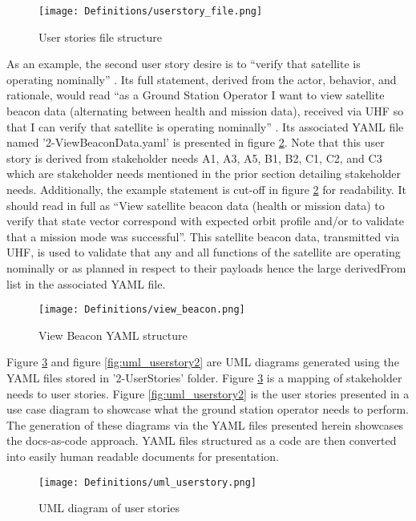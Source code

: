 \documentclass[journal,article,submit,pdftex,moreauthors]{Definitions/mdpi}
\begin{document}
\begin{figure}[H]
    \texttt{[image: Definitions/userstory\_file.png]}
    \caption{User stories file structure}
	\label{fig:userstory_file}
    \end{figure}
	\noindent   
\unskip

As an example, the second user story desire is to “verify that satellite is operating nominally” \cite{sealion_mission_architecture}.  Its full statement, derived from the actor, behavior, and rationale, would read “as a Ground Station Operator I want to view satellite beacon data (alternating between health and mission data), received via UHF so that I can verify that satellite is operating nominally” \cite{sealion_page}.  Its associated YAML file named '2-ViewBeaconData.yaml' is presented in figure \ref{fig:view_beacon}.  Note that this user story is derived from stakeholder needs A1, A3, A5, B1, B2, C1, C2, and C3 which are stakeholder needs mentioned in the prior section detailing stakeholder needs.  Additionally, the example statement is cut-off in figure \ref{fig:view_beacon} for readability.  It should read in full as “View satellite beacon data (health or mission data) to verify that state vector correspond with expected orbit profile and/or to validate that a mission mode was successful”.  This satellite beacon data, transmitted via UHF, is used to validate that any and all functions of the satellite are operating nominally or as planned in respect to their payloads hence the large derivedFrom list in the associated YAML file.

\begin{figure}[H]
    \texttt{[image: Definitions/view\_beacon.png]}
    \caption{View Beacon YAML structure}
	\label{fig:view_beacon}
    \end{figure}
	\noindent   
\unskip

Figure \ref{fig:uml_userstory} and figure \ref{fig:uml_userstory2} are UML diagrams generated using the YAML files stored in '2-UserStories' folder.  Figure \ref{fig:uml_userstory} is a mapping of stakeholder needs to user stories.  Figure \ref{fig:uml_userstory2} is the user stories presented in a use case diagram to showcase what the ground station operator needs to perform.  The generation of these diagrams via the YAML files presented herein showcases the docs-as-code approach.  YAML files structured as a code are then converted into easily human readable documents for presentation.

\begin{figure}[H]
    \texttt{[image: Definitions/uml\_userstory.png]}
    \caption{UML diagram of user stories}
	\label{fig:uml_userstory}
    \end{figure}   
\unskip
\end{document}

